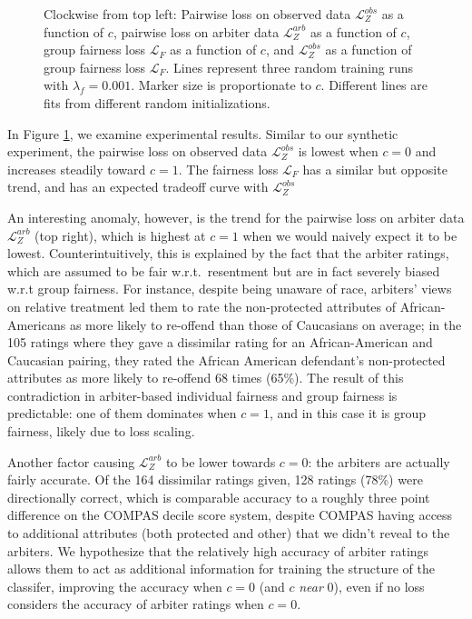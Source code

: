\begin{figure}
            \caption{Clockwise from top left: Pairwise loss on observed data $\mathcal{L}_Z^{obs}$  as a function of $c$, pairwise loss on arbiter data $\mathcal{L}_Z^{arb}$ as a function of $c$, group fairness loss $\mathcal{L}_F$ as a function of $c$, and $\mathcal{L}_Z^{obs}$ as a function of group fairness loss $\mathcal{L}_F$.  Lines represent three random training runs with $\lambda_f = 0.001$.  Marker size is proportionate to $c$. Different lines are fits from different random initializations.}
            \label{fig:sm_compas_tradeoffs}
        \end{figure}
        
        In Figure \ref{fig:sm_compas_tradeoffs}, we examine experimental results.  Similar to our synthetic experiment, the pairwise loss on observed data $\mathcal{L}_Z^{obs}$ is lowest when $c = 0$ and increases steadily toward $c = 1$.  The fairness loss $\mathcal{L}_F$ has a similar but opposite trend, and has an expected tradeoff curve with $\mathcal{L}_Z^{obs}$
        
        An interesting anomaly, however, is the trend for the pairwise loss on arbiter data $\mathcal{L}_Z^{arb}$ (top right), which is highest at $c = 1$ when we would naively expect it to be lowest.  Counterintuitively, this is explained by the fact that the arbiter ratings, which are assumed to be fair w.r.t.~resentment but are in fact severely biased w.r.t group fairness.  For instance, despite being unaware of race, arbiters' views on relative treatment led them to rate the non-protected attributes of African-Americans as more likely to re-offend than those of Caucasians on average; in the 105 ratings where they gave a dissimilar rating for an African-American and Caucasian pairing, they rated the African American defendant's non-protected attributes as more likely to re-offend 68 times (65\%). The result of this contradiction in arbiter-based individual fairness and group fairness is predictable: one of them dominates when $c=1$, and in this case it is group fairness, likely due to loss scaling.  
        
        Another factor causing $\mathcal{L}_Z^{arb}$ to be lower towards $c=0$: the arbiters are actually fairly accurate.  Of the 164 dissimilar ratings given, 128 ratings (78\%) were directionally correct, which is comparable accuracy to a roughly three point difference on the COMPAS decile score system, despite COMPAS having access to additional attributes (both protected and other) that we didn't reveal to the arbiters. We hypothesize that the relatively high accuracy of arbiter ratings allows them to act as additional information for training the structure of the classifer, improving the accuracy when $c=0$ (and $c$ \emph{near} 0), even if no loss considers the accuracy of arbiter ratings when $c = 0$. 
        
